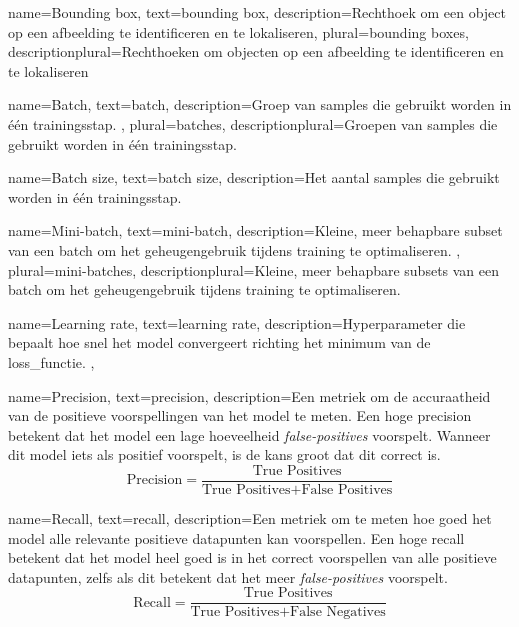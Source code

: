{
    name={Bounding box},
    text={bounding box},
    description={Rechthoek om een object op een afbeelding te identificeren en te lokaliseren},
    plural={bounding boxes},
    descriptionplural={Rechthoeken om objecten op een afbeelding te identificeren en te lokaliseren}
}

{
    name={Batch},
    text={batch},
    description={Groep van samples die gebruikt worden in één trainingsstap. \autocite{Geron_2023}},
    plural={batches},
    descriptionplural={Groepen van samples die gebruikt worden in één trainingsstap. \autocite{Geron_2023}}    
}

{
    name={Batch size},
    text={batch size},
    description={Het aantal samples die gebruikt worden in één trainingsstap. \autocite{Geron_2023}}
}

{
    name={Mini-batch},
    text={mini-batch},
    description={Kleine, meer behapbare subset van een batch om het geheugengebruik tijdens training te optimaliseren. \autocite{Geron_2023}},
    plural={mini-batches},
    descriptionplural={Kleine, meer behapbare subsets van een batch om het geheugengebruik tijdens training te optimaliseren. \autocite{Geron_2023}}    
}

{
    name={Learning rate},
    text={learning rate},
    description={Hyperparameter die bepaalt hoe snel het model convergeert richting het minimum van de \gls{loss_functie}. \autocite{Geron_2023}},
}

{
    name={Precision},
    text={precision},
    description={Een metriek om de accuraatheid van de positieve voorspellingen van het model te meten. Een hoge precision betekent dat het model een lage hoeveelheid \emph{false-positives} voorspelt. Wanneer dit model iets als positief voorspelt, is de kans groot dat dit correct is. 
        $$
        \text{Precision} = \frac{\text{True Positives}}{\text{True Positives} + \text{False Positives}}
        $$
        \autocite{Geron_2023}}
}

{
    name={Recall},
    text={recall},
    description={Een metriek om te meten hoe goed het model alle relevante positieve datapunten kan voorspellen. Een hoge recall betekent dat het model heel goed is in het correct voorspellen van alle positieve datapunten, zelfs als dit betekent dat het meer \emph{false-positives} voorspelt.
        $$
        \text{Recall} = \frac{\text{True Positives}}{\text{True Positives} + \text{False Negatives}}
        $$
        \autocite{Geron_2023}}
}

